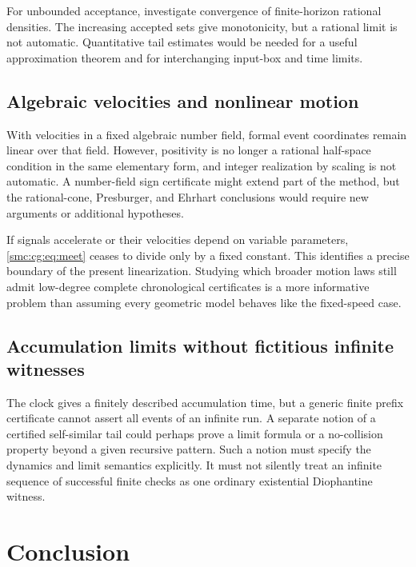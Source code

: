 \documentclass[11pt,letterpaper]{article}
\numberwithin{equation}{section}
\theoremstyle{definition}
\theoremstyle{remark}
\begin{document}
For unbounded acceptance, investigate convergence of finite-horizon rational
densities. The increasing accepted sets give monotonicity, but a rational
limit is not automatic. Quantitative tail estimates would be needed for a
useful approximation theorem and for interchanging input-box and time limits.

\subsection{Algebraic velocities and nonlinear motion}\label{smc:cg:q:algebraic}

With velocities in a fixed algebraic number field, formal event coordinates
remain linear over that field. However, positivity is no longer a rational
half-space condition in the same elementary form, and integer realization
by scaling is not automatic. A number-field sign certificate might extend
part of the method, but the rational-cone, Presburger, and Ehrhart conclusions
would require new arguments or additional hypotheses.

If signals accelerate or their velocities depend on variable parameters,
\eqref{smc:cg:eq:meet} ceases to divide only by a fixed constant. This identifies a
precise boundary of the present linearization. Studying which broader motion
laws still admit low-degree complete chronological certificates is a more
informative problem than assuming every geometric model behaves like the
fixed-speed case.

\subsection{Accumulation limits without fictitious infinite witnesses}\label{smc:cg:q:accumulation}

The clock gives a finitely described accumulation time, but a generic finite
prefix certificate cannot assert all events of an infinite run. A separate
notion of a certified self-similar tail could perhaps prove a limit formula
or a no-collision property beyond a given recursive pattern. Such a notion
must specify the dynamics and limit semantics explicitly. It must not
silently treat an infinite sequence of successful finite checks as one
ordinary existential Diophantine witness.

\section{Conclusion}
\label{smc:cg:sec:conclusion}
\end{document}
